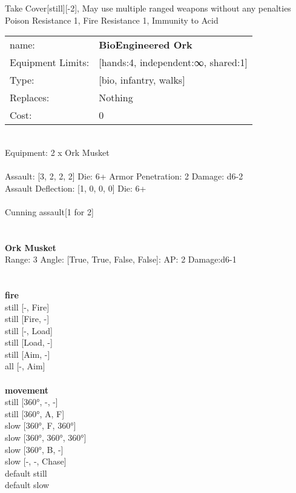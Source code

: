 \noindent Take Cover[still][-2], May use multiple ranged weapons without any penalties\\ 
Poison Resistance 1, Fire Resistance 1, Immunity to Acid\\ 


\noindent
\begin{tabular}{ll}
name: &{\bf BioEngineered Ork } \\
Equipment Limits: &[hands:4, independent:∞, shared:1] \\
Type: &[bio, infantry, walks] \\
Replaces: &Nothing \\
Cost: & 0\\
\end{tabular}
\ \\
Equipment: 2 x Ork Musket \\
\ \\
Assault: [3, 2, 2, 2] Die: 6+ Armor Penetration: 2 Damage: d6-2 \\
Assault Deflection: [1, 0, 0, 0] Die: 6+\\
\\ 
Cunning assault[1 for 2]\\ 
 
\ \\

\ \\
{\bf Ork Musket } \\



Range: 3  Angle: [True, True, False, False]: AP: 2 Damage:d6-1 \\




 
\ \\



\ \\ {\bf fire } \\
still [-, Fire] \\
still [Fire, -] \\
still [-, Load] \\
still [Load, -] \\
still [Aim, -] \\
all [-, Aim] \\
\ \\ {\bf movement } \\
still [360°, -, -] \\
still [360°, A, F] \\
slow [360°, F, 360°] \\
slow [360°, 360°, 360°] \\
slow [360°, B, -] \\
slow [-, -, Chase] \\
default still \\
default slow \\


